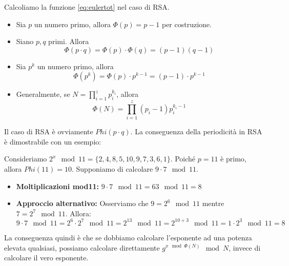 Calcoliamo la funzione \cref{eq:eulertot} nel caso di RSA. 
\begin{itemize}
    \item Sia $p$ un numero primo, allora $\Phi(p)=p-1$ per costruzione.
    \item Siano $p,q$ primi. Allora \[\Phi(p\cdot{q})=\Phi(p)\cdot\Phi(q)=(p-1)(q-1)\]
    \item Sia $p^k$ un numero primo, allora 
    \[\Phi(p^k)=\Phi(p)\cdot p^{k-1}=(p-1)\cdot p^{k-1}\]
    \item Generalmente, se $N=\prod_{i=1}^{z}p_i^{k_i}$, allora
    \[\Phi(N)=\prod_{i=1}^{z}(p_i-1)p_i^{k_i-1}\]
\end{itemize}
Il caso di RSA è ovviamente $Phi(p\cdot{q})$. La conseguenza della periodicità in RSA è dimostrabile con un esempio:
\begin{example}
Consideriamo $2^x\mod{11}=\{2,4,8,5,10,9,7,3,6,1\}$. Poiché $p=11$ è primo, allora $Phi(11)=10$. Supponiamo di calcolare $9\cdot7\mod11$.
\begin{itemize}
    \item \textbf{Moltiplicazioni mod11:} $9\cdot7\mod11=63\mod11=8$
    \item \textbf{Approccio alternativo:} Osserviamo che $9=2^6\mod11$ mentre $7=2^7\mod11$. Allora:
    \[9\cdot7\mod11=2^6\cdot2^7\mod11=2^{13}\mod11=2^{10+3}\mod11=1\cdot2^3\mod11=8\]
\end{itemize}
\begin{note}
La conseguenza quindi è che se dobbiamo calcolare l'esponente ad una potenza elevata qualsiasi, possiamo calcolare direttamente $g^{x\mod\Phi(N)}\mod N$, invece di calcolare il vero esponente.
\end{note}
\end{example}\pagebreak
